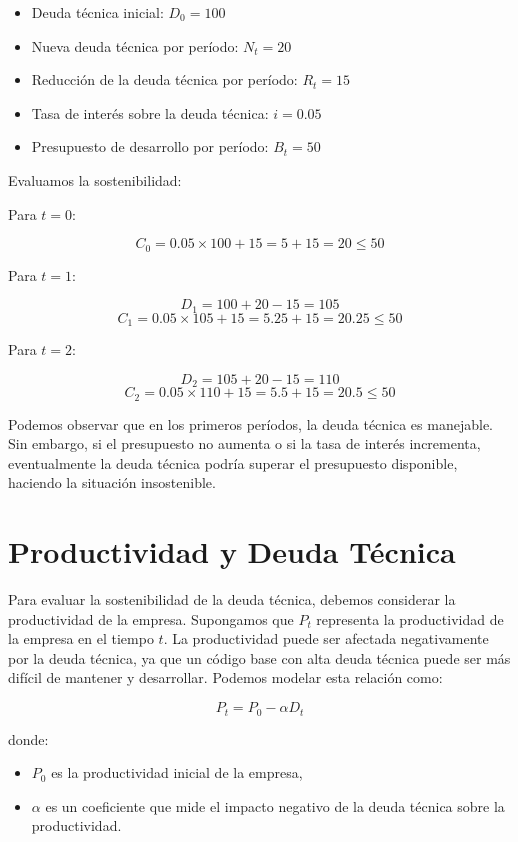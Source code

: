 \documentclass[12pt]{article}
\begin{document}
\begin{itemize}
    \item Deuda técnica inicial: \(D_0 = 100\)
    \item Nueva deuda técnica por período: \(N_t = 20\)
    \item Reducción de la deuda técnica por período: \(R_t = 15\)
    \item Tasa de interés sobre la deuda técnica: \(i = 0.05\)
    \item Presupuesto de desarrollo por período: \(B_t = 50\)
\end{itemize}

Evaluamos la sostenibilidad:

Para \(t = 0\):

\[
C_0 = 0.05 \times 100 + 15 = 5 + 15 = 20 \leq 50
\]

Para \(t = 1\):

\[
D_1 = 100 + 20 - 15 = 105
\]
\[
C_1 = 0.05 \times 105 + 15 = 5.25 + 15 = 20.25 \leq 50
\]

Para \(t = 2\):

\[
D_2 = 105 + 20 - 15 = 110
\]
\[
C_2 = 0.05 \times 110 + 15 = 5.5 + 15 = 20.5 \leq 50
\]

Podemos observar que en los primeros períodos, la deuda técnica es manejable. Sin embargo, si el presupuesto no aumenta o si la tasa de interés incrementa, eventualmente la deuda técnica podría superar el presupuesto disponible, haciendo la situación insostenible.

\section{Productividad y Deuda Técnica}
Para evaluar la sostenibilidad de la deuda técnica, debemos considerar la productividad de la empresa. Supongamos que \(P_t\) representa la productividad de la empresa en el tiempo \(t\). La productividad puede ser afectada negativamente por la deuda técnica, ya que un código base con alta deuda técnica puede ser más difícil de mantener y desarrollar. Podemos modelar esta relación como:

\[
P_t = P_0 - \alpha D_t
\]

donde:
\begin{itemize}
    \item \(P_0\) es la productividad inicial de la empresa,
    \item \(\alpha\) es un coeficiente que mide el impacto negativo de la deuda técnica sobre la productividad.
\end{itemize}
\end{document}
